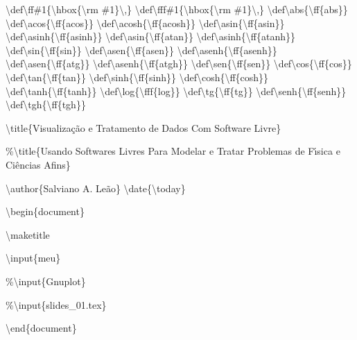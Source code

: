 \backslash{}def\backslash{}ff\#1\{\backslash{}hbox\{\backslash{}rm \#1\}\backslash{},\}
\backslash{}def\backslash{}fff\#1\{\backslash{}hbox\{\backslash{}rm \#1\}\backslash{},\}
\backslash{}def\backslash{}abs\{\backslash{}ff\{abs\}\}
\backslash{}def\backslash{}acos\{\backslash{}ff\{acos\}\}
\backslash{}def\backslash{}acosh\{\backslash{}ff\{acosh\}\}
\backslash{}def\backslash{}asin\{\backslash{}ff\{asin\}\}
\backslash{}def\backslash{}asinh\{\backslash{}ff\{asinh\}\}
\backslash{}def\backslash{}asin\{\backslash{}ff\{atan\}\}
\backslash{}def\backslash{}asinh\{\backslash{}ff\{atanh\}\}
\backslash{}def\backslash{}sin\{\backslash{}ff\{sin\}\}
\backslash{}def\backslash{}asen\{\backslash{}ff\{asen\}\}
\backslash{}def\backslash{}asenh\{\backslash{}ff\{asenh\}\}
\backslash{}def\backslash{}asen\{\backslash{}ff\{atg\}\}
\backslash{}def\backslash{}asenh\{\backslash{}ff\{atgh\}\}
\backslash{}def\backslash{}sen\{\backslash{}ff\{sen\}\}
\backslash{}def\backslash{}cos\{\backslash{}ff\{cos\}\}
\backslash{}def\backslash{}tan\{\backslash{}ff\{tan\}\}
\backslash{}def\backslash{}sinh\{\backslash{}ff\{sinh\}\}
\backslash{}def\backslash{}cosh\{\backslash{}ff\{cosh\}\}
\backslash{}def\backslash{}tanh\{\backslash{}ff\{tanh\}\}
\backslash{}def\backslash{}log\{\backslash{}fff\{log\}\}
\backslash{}def\backslash{}tg\{\backslash{}ff\{tg\}\}
\backslash{}def\backslash{}senh\{\backslash{}ff\{senh\}\}
\backslash{}def\backslash{}tgh\{\backslash{}ff\{tgh\}\}

\backslash{}title\{Visualiza\c{c}\~ao e Tratamento de Dados Com Software Livre\}

\%\backslash{}title\{Usando Softwares Livres Para Modelar e Tratar Problemas de F\'{\i}sica e Ci\^encias Afins\}

\backslash{}author\{Salviano A. Le\~ao\}
\backslash{}date\{\backslash{}today\}

\backslash{}begin\{document\}

\backslash{}maketitle

\backslash{}input\{meu\}

\%\backslash{}input\{Gnuplot\}

\%\backslash{}input\{slides\_01.tex\}

\backslash{}end\{document\}
